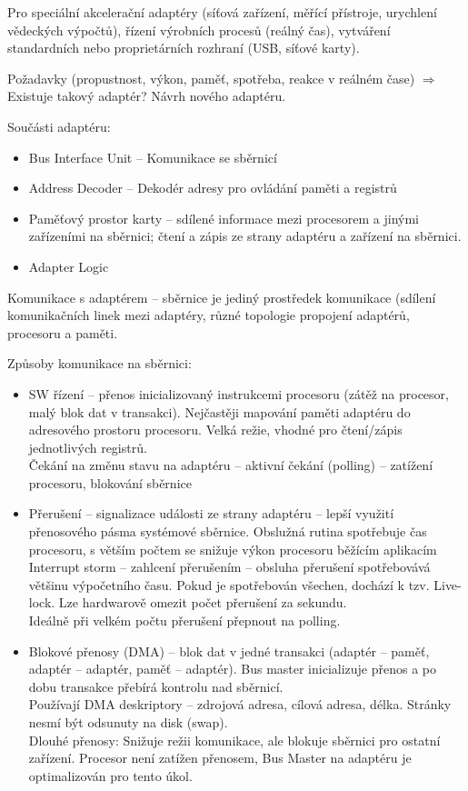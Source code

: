 \documentclass[a4paper, 11pt]{report}
\begin{document}
Pro speciální akcelerační adaptéry (síťová zařízení, měřící přístroje, urychlení vědeckých výpočtů), řízení výrobních procesů (reálný čas), vytváření standardních nebo proprietárních rozhraní (USB, síťové karty).

Požadavky (propustnost, výkon, paměť, spotřeba, reakce v reálném čase) $\Rightarrow$ Existuje takový adaptér? Návrh nového adaptéru.

Součásti adaptéru:
\begin{itemize}
	\item Bus Interface Unit -- Komunikace se sběrnicí
	\item Address Decoder -- Dekodér adresy pro ovládání paměti a registrů
	\item Paměťový prostor karty -- sdílené informace mezi procesorem a jinými zařízeními na sběrnici; čtení a zápis ze strany adaptéru a zařízení na sběrnici.
	\item Adapter Logic
\end{itemize}

Komunikace s adaptérem -- sběrnice je jediný prostředek komunikace (sdílení komunikačních linek mezi adaptéry, různé topologie propojení adaptérů, procesoru a paměti.

Způsoby komunikace na sběrnici:
\begin{itemize}
	\item SW řízení -- přenos inicializovaný instrukcemi procesoru (zátěž na procesor, malý blok dat v transakci). Nejčastěji mapování paměti adaptéru do adresového prostoru procesoru. Velká režie, vhodné pro čtení/zápis jednotlivých registrů.\\
	Čekání na změnu stavu na adaptéru -- aktivní čekání (polling) -- zatížení procesoru, blokování sběrnice
	\item Přerušení -- signalizace události ze strany adaptéru -- lepší využití přenosového pásma systémové sběrnice. Obslužná rutina spotřebuje čas procesoru, s větším počtem se snižuje výkon procesoru běžícím aplikacím\\
	Interrupt storm -- zahlcení přerušením -- obsluha přerušení spotřebovává většinu výpočetního času. Pokud  je spotřebován všechen, dochází k tzv. Live-lock. Lze hardwarově omezit počet přerušení za sekundu.\\
	Ideálně při velkém počtu přerušení přepnout na polling.
	\item Blokové přenosy (DMA) -- blok dat v jedné transakci (adaptér -- paměť, adaptér -- adaptér, paměť -- adaptér). Bus master inicializuje přenos a po dobu transakce přebírá kontrolu nad sběrnicí.\\
	Používají DMA deskriptory -- zdrojová adresa, cílová adresa, délka. Stránky nesmí být odsunuty na disk (swap).\\
	Dlouhé přenosy: Snižuje režii komunikace, ale blokuje sběrnici pro ostatní zařízení. Procesor není zatížen přenosem, Bus Master na adaptéru je optimalizován pro tento úkol.
\end{itemize}
\end{document}
